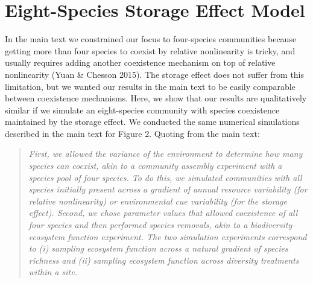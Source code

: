 \documentclass[11pt,]{article}
\begin{document}
\newpage{}

\section{Eight-Species Storage Effect Model}

In the main text we constrained our focus to four-species communities
because getting more than four species to coexist by relative
nonlinearity is tricky, and usually requires adding another coexistence
mechanism on top of relative nonlinearity (Yuan \& Chesson 2015). The
storage effect does not suffer from this limitation, but we wanted our
results in the main text to be easily comparable between coexistence
mechanisms. Here, we show that our results are qualitatively similar if
we simulate an eight-species community with species coexistence
maintained by the storage effect. We conducted the same numerical
simulations described in the main text for Figure 2. Quoting from the
main text:

\begin{quote}
\emph{First, we allowed the variance of the environment to determine how many species can coexist, akin to a community assembly experiment with a species pool of four species.
To do this, we simulated communities with all species initially present across a gradient of annual resource variability (for relative nonlinearity) or environmental cue variability (for the storage effect).
Second, we chose parameter values that allowed coexistence of all four species and then performed species removals, akin to a biodiversity--ecosystem function experiment.
The two simulation experiments correspond to (i) sampling ecosystem function across a natural gradient of species richness and (ii) sampling ecosystem function across diversity treatments within a site.}
\end{quote}
\end{document}

